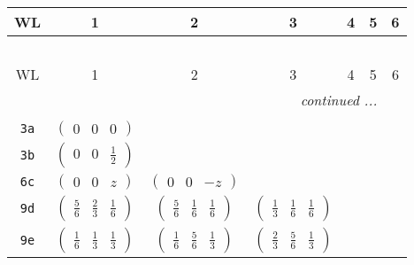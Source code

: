 \documentclass[fleqn,9pt,landscape]{jsarticle}
\begin{document}
\begin{center}
\renewcommand{\arraystretch}{1.2}
\begin{longtable}{ccccccc}
 \hline \hline
WL & 1 & 2 & 3 & 4 & 5 & 6 \\ \hline \endfirsthead

\multicolumn{6}{l}{\tablename\ \thetable{}} \\
 \hline \hline
WL & 1 & 2 & 3 & 4 & 5 & 6 \\ \hline \endhead

 \hline \hline
\multicolumn{6}{r}{\footnotesize\it continued ...} \\ \endfoot

 \hline \hline
\multicolumn{6}{r}{} \\ \endlastfoot

{\tt 3a} & $ \begin{pmatrix} 0 & 0 & 0 \end{pmatrix} $ & $  $ & $  $ & $  $ & $  $ & $  $ \\ \hline
{\tt 3b} & $ \begin{pmatrix} 0 & 0 & \frac{1}{2} \end{pmatrix} $ & $  $ & $  $ & $  $ & $  $ & $  $ \\ \hline
{\tt 6c} & $ \begin{pmatrix} 0 & 0 & z \end{pmatrix} $ & $ \begin{pmatrix} 0 & 0 & - z \end{pmatrix} $ & $  $ & $  $ & $  $ & $  $ \\ \hline
{\tt 9d} & $ \begin{pmatrix} \frac{5}{6} & \frac{2}{3} & \frac{1}{6} \end{pmatrix} $ & $ \begin{pmatrix} \frac{5}{6} & \frac{1}{6} & \frac{1}{6} \end{pmatrix} $ & $ \begin{pmatrix} \frac{1}{3} & \frac{1}{6} & \frac{1}{6} \end{pmatrix} $ & $  $ & $  $ & $  $ \\ \hline
{\tt 9e} & $ \begin{pmatrix} \frac{1}{6} & \frac{1}{3} & \frac{1}{3} \end{pmatrix} $ & $ \begin{pmatrix} \frac{1}{6} & \frac{5}{6} & \frac{1}{3} \end{pmatrix} $ & $ \begin{pmatrix} \frac{2}{3} & \frac{5}{6} & \frac{1}{3} \end{pmatrix} $ & $  $ & $  $ & $  $ \\ \hline

\end{longtable}
\end{center}
\end{document}
